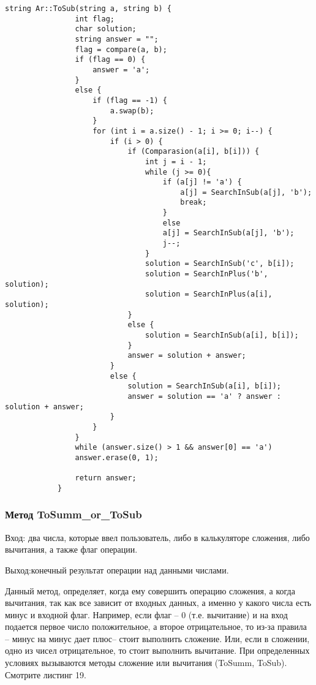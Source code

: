 \documentclass[10pt,a4paper,final]{article} %
\begin{document}
		\begin{lstlisting}[caption={Метод ToSub}]
			string Ar::ToSub(string a, string b) {
				int flag;
				char solution;
				string answer = "";
				flag = compare(a, b);
				if (flag == 0) {
					answer = 'a';
				}
				else {
					if (flag == -1) {
						a.swap(b);
					}
					for (int i = a.size() - 1; i >= 0; i--) {
						if (i > 0) {
							if (Comparasion(a[i], b[i])) {
								int j = i - 1;
								while (j >= 0){
									if (a[j] != 'a') {
										a[j] = SearchInSub(a[j], 'b');
										break;
									}
									else
									a[j] = SearchInSub(a[j], 'b');
									j--;
								}
								solution = SearchInSub('c', b[i]);
								solution = SearchInPlus('b', solution);
								solution = SearchInPlus(a[i], solution);
							}
							else {
								solution = SearchInSub(a[i], b[i]);
							}
							answer = solution + answer;
						}
						else {
							solution = SearchInSub(a[i], b[i]);
							answer = solution == 'a' ? answer : solution + answer;
						}
					}
				}
				while (answer.size() > 1 && answer[0] == 'a')
				answer.erase(0, 1);
				
				return answer;
			}
		\end{lstlisting}
		
		\subsubsection{Метод ToSumm\_or\_ToSub}
		
		Вход: два числа, которые ввел пользователь, либо в калькуляторе сложения, либо вычитания, а также флаг операции.
		
		Выход:конечный результат операции над данными числами.
		
		Данный метод, определяет, когда ему совершить операцию сложения, а когда вычитания, так как все зависит от входных данных, а именно у какого числа есть минус и входной флаг. Например, если флаг -- 0 (т.е. вычитание) и на вход подается первое число положительное, а второе отрицательное, то из-за правила -- минус на минус дает плюс-- стоит выполнить сложение. Или, если в сложении, одно из чисел отрицательное, то стоит выполнить вычитание. При определенных условиях вызываются методы сложение или вычитания (ToSumm, ToSub). Смотрите листинг 19.
		
\end{document}
